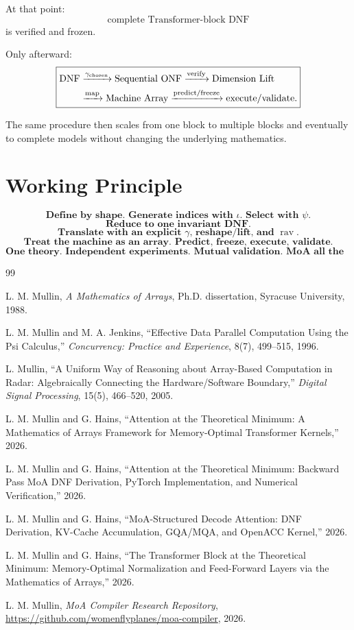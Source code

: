 \documentclass[11pt]{article}
\newcommand{\DNF}{\mathrm{DNF}}
\newcommand{\rav}{\operatorname{rav}}
\begin{document}
At that point:
\[
\boxed{\text{complete Transformer-block DNF}}
\]
is verified and frozen.

Only afterward:
\[
\boxed{\begin{aligned}
\DNF &\xrightarrow{\gamma_{\rm chosen}} \text{Sequential ONF}
\xrightarrow{\text{verify}} \text{Dimension Lift}\\
&\xrightarrow{\text{map}} \text{Machine Array}
\xrightarrow{\text{predict/freeze}} \text{execute/validate}.
\end{aligned}}
\]

The same procedure then scales from one block to multiple blocks and eventually to complete
models without changing the underlying mathematics.

\section*{Working Principle}

\[
\boxed{\textbf{Define by shape. Generate indices with \(\iota\). Select with \(\psi\).}}
\]
\[
\boxed{\textbf{Reduce to one invariant DNF.}}
\]
\[
\boxed{\textbf{Translate with an explicit \(\gamma\), reshape/lift, and \(\rav\).}}
\]
\[
\boxed{\textbf{Treat the machine as an array. Predict, freeze, execute, validate.}}
\]
\[
\boxed{\textbf{One theory. Independent experiments. Mutual validation. MoA all the way.}}
\]

\begin{thebibliography}{99}

L. M. Mullin,
\emph{A Mathematics of Arrays},
Ph.D. dissertation, Syracuse University, 1988.

L. M. Mullin and M. A. Jenkins,
``Effective Data Parallel Computation Using the Psi Calculus,''
\emph{Concurrency: Practice and Experience}, 8(7), 499--515, 1996.

L. Mullin,
``A Uniform Way of Reasoning about Array-Based Computation in Radar:
Algebraically Connecting the Hardware/Software Boundary,''
\emph{Digital Signal Processing}, 15(5), 466--520, 2005.

L. M. Mullin and G. Hains,
``Attention at the Theoretical Minimum: A Mathematics of Arrays Framework
for Memory-Optimal Transformer Kernels,'' 2026.

L. M. Mullin and G. Hains,
``Attention at the Theoretical Minimum: Backward Pass MoA DNF Derivation,
PyTorch Implementation, and Numerical Verification,'' 2026.

L. M. Mullin and G. Hains,
``MoA-Structured Decode Attention: DNF Derivation, KV-Cache Accumulation,
GQA/MQA, and OpenACC Kernel,'' 2026.

L. M. Mullin and G. Hains,
``The Transformer Block at the Theoretical Minimum: Memory-Optimal
Normalization and Feed-Forward Layers via the Mathematics of Arrays,'' 2026.

L. M. Mullin,
\emph{MoA Compiler Research Repository},
\url{https://github.com/womenflyplanes/moa-compiler}, 2026.

\end{thebibliography}
\end{document}
